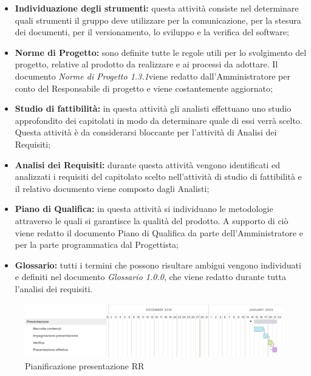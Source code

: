\begin{itemize}
	\item \textbf{Individuazione degli strumenti:} questa attività consiste nel determinare quali strumenti il gruppo deve utilizzare per la comunicazione, per la stesura dei documenti, per il versionamento, lo sviluppo e la verifica del software;
	\item \textbf{Norme di Progetto:} sono definite tutte le regole utili per lo svolgimento del progetto, relative al prodotto da realizzare e ai processi da adottare. Il documento \textit{Norme di Progetto 1.3.1}\doc viene redatto dall'Amministratore per conto del Responsabile di progetto e viene costantemente aggiornato;
	\item \textbf{Studio di fattibilità:} in questa attività gli analisti effettuano uno studio approfondito dei capitolati in modo da determinare quale di essi verrà scelto. Questa attività è da considerarsi bloccante per l’attività di Analisi dei Requisiti;
	\item \textbf{Analisi dei Requisiti:} durante questa attività vengono identificati ed analizzati i requisiti del capitolato scelto nell'attività di studio di fattibilità e il relativo documento viene composto dagli Analisti;
	\item \textbf{Piano di Qualifica:} in questa attività si individuano le metodologie attraverso le quali si garantisce la qualità del prodotto. A supporto di ciò viene redatto il documento Piano di Qualifica da parte dell'Amministratore e per la parte programmatica dal Progettista;
	\item \textbf{Glossario:} tutti i termini che possono risultare ambigui vengono individuati e definiti nel documento \textit{Glossario 1.0.0}\docs, che viene redatto durante tutta l'analisi dei requisiti.
\end{itemize}

\begin{figure}[h!]
	\includegraphics[width=\textwidth]{res/img/g2}
	\caption{Pianificazione presentazione RR}
\end{figure}

\newpage
